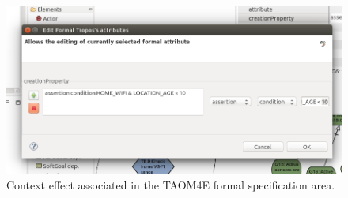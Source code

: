 \begin{figure}
\centering
\includegraphics[width=1\textwidth]{imgs/TAOM4E_CTX_CREATION.png}
\caption{Context effect associated in the TAOM4E formal specification area.}
\label{fig:TAOM4E_CTX_CREATION}
\end{figure}





